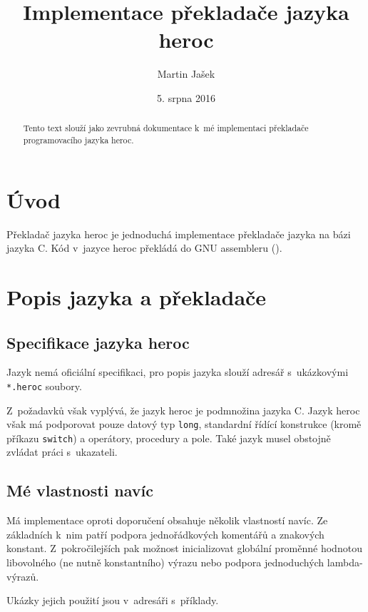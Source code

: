 \documentclass[a4paper,10pt]{article}
\title{Implementace překladače jazyka heroc}
\author{Martin Jašek}
\date{5. srpna 2016}
\begin{document}
\maketitle

\begin{abstract}
Tento text slouží jako zevrubná dokumentace k~mé implementaci překladače programovacího jazyka heroc.
\end{abstract}

\tableofcontents
\newpage

\section{Úvod}
Překladač jazyka heroc je jednoduchá implementace překladače jazyka na bázi jazyka C. Kód v~jazyce heroc překládá do GNU assembleru ().

\section{Popis jazyka a překladače}

\subsection{Specifikace jazyka heroc}
Jazyk nemá oficiální specifikaci, pro popis jazyka slouží adresář s~ukázkovými \verb|*.heroc| soubory.

Z~požadavků však vyplývá, že jazyk heroc je podmnožina jazyka C. Jazyk heroc však má podporovat pouze datový typ \verb|long|, standardní řídící konstrukce (kromě příkazu \verb|switch|) a operátory, procedury a pole. Také jazyk musel obstojně zvládat práci s~ukazateli.

\subsection{Mé vlastnosti navíc}
Má implementace oproti doporučení obsahuje několik vlastností navíc. Ze základních k~nim patří podpora jednořádkových komentářů a znakových konstant. Z~pokročilejších pak možnost inicializovat globální proměnné hodnotou libovolného (ne nutně konstantního) výrazu nebo podpora jednoduchých lambda-výrazů.

Ukázky jejich použití jsou v~adresáři s~příklady.
\end{document}
